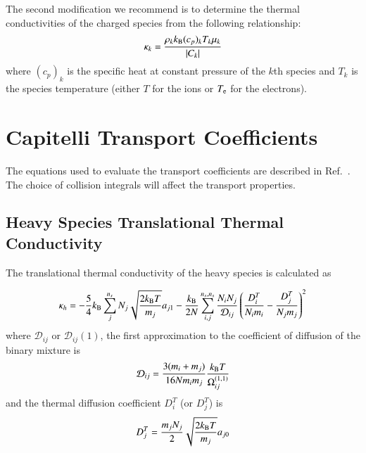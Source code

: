\documentclass{warpdoc}
\begin{document}
The second modification we recommend is to determine the thermal conductivities of the charged species from the following relationship:
%
\begin{equation}
  \kappa_k = \frac{\rho_k k_{\rm B} (c_p)_k T_k \mu_k}{|C_k|}    
\end{equation}
%
where $(c_p)_k$ is the specific heat at constant pressure of the $k$th species and $T_k$ is the species temperature (either $T$ for the ions or $T_{\rm e}$ for the electrons).
\section{Capitelli Transport Coefficients}

The equations used to evaluate the transport coefficients are described in Ref.\ \cite{tepjd:2000:capitelli}. The choice of collision integrals will affect the transport properties. 
\subsection{Heavy Species Translational Thermal Conductivity}

The translational thermal conductivity of the heavy species is calculated as

\begin{equation}\label{eq:heavykappa}
  \kappa_h=-\frac{5}{4}k_{\rm B}\sum_{j}^{n_s} N_{j}\sqrt{\frac{2k_{\rm B}T}{m_j}}a_{j1}-\frac{k_{\rm B}}{2N}\sum_{i,j}^{n_s,n_s}\frac{N_{i}N_{j}}{\mathcal{D}_{i j}}\left(\frac{D_{i}^{T}}{N_{i}m_{i}}-\frac{D_{j}^{T}}{N_{j}m_{j}}\right)^{2}
\end{equation}
where $\mathcal{D}_{i j}$ or $\mathcal{D}_{i j}(1)$, the first approximation to the coefficient of diffusion of the binary mixture is
\begin{equation}
  {\cal D}_{ij}=\frac{3(m_i+m_j)}{16N m_i m_j}\frac{k_{\rm B}T}{\Omega_{ij}^{(1,1)}}
\end{equation}
and the thermal diffusion coefficient $D_i^T$ (or $D_j^T$) is
\begin{equation}\label{eq:Tdiffcoeff}
  D_j^T=\frac{m_j N_j}{2}\sqrt{\frac{2 k_{\rm B} T}{m_j}}a_{j0}
\end{equation}
\end{document}
